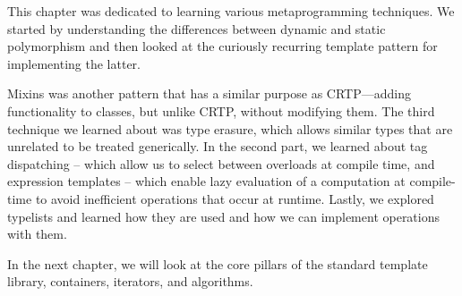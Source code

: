 This chapter was dedicated to learning various metaprogramming techniques. We started by understanding the differences between dynamic and static polymorphism and then looked at the curiously recurring template pattern for implementing the latter.

Mixins was another pattern that has a similar purpose as CRTP—adding functionality to classes, but unlike CRTP, without modifying them. The third technique we learned about was type erasure, which allows similar types that are unrelated to be treated generically. In the second part, we learned about tag dispatching – which allow us to select between overloads at compile time, and expression templates – which enable lazy evaluation of a computation at compile-time to avoid inefficient operations that occur at runtime.
Lastly, we explored typelists and learned how they are used and how we can implement operations with them.

In the next chapter, we will look at the core pillars of the standard template library, containers, iterators, and algorithms.